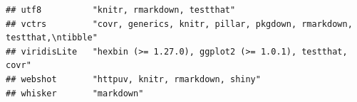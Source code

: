\documentclass[]{article}
\begin{document}
\begin{verbatim}
## utf8          "knitr, rmarkdown, testthat"                                                                                                                                                                                                                                                                                                                                                                                                                                                                                                                                                              
## vctrs         "covr, generics, knitr, pillar, pkgdown, rmarkdown, testthat,\ntibble"                                                                                                                                                                                                                                                                                                                                                                                                                                                                                                                    
## viridisLite   "hexbin (>= 1.27.0), ggplot2 (>= 1.0.1), testthat, covr"                                                                                                                                                                                                                                                                                                                                                                                                                                                                                                                                  
## webshot       "httpuv, knitr, rmarkdown, shiny"                                                                                                                                                                                                                                                                                                                                                                                                                                                                                                                                                         
## whisker       "markdown"                                                                                                                                                                                                                                                                                                                                                                                                                                                                                                                                                                                

\end{verbatim}
\end{document}
